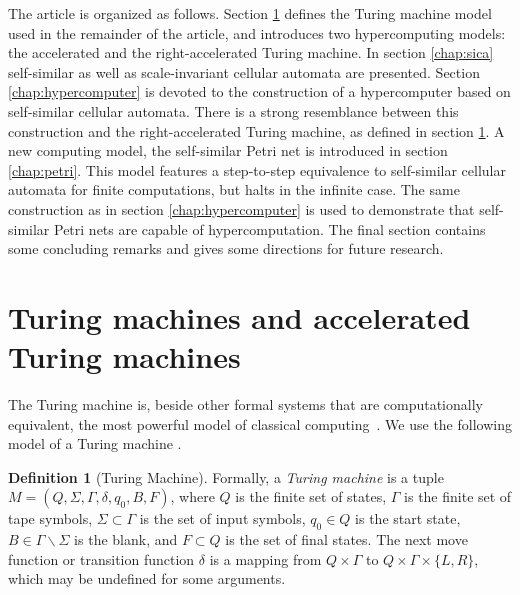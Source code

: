 \documentclass[pre,showpacs,showkeys,preprint]{revtex4}
\theoremstyle{definition}
\newtheorem{defn}{Definition}
\begin{document}

The article is organized as follows.
Section \ref{sec-tm} defines the  Turing machine model used in the remainder of the article,
and introduces two hypercomputing models: the accelerated and the right-accelerated Turing machine.
In section \ref{chap:sica} self-similar as well as scale-invariant cellular automata are presented.
Section \ref{chap:hypercomputer} is devoted to the construction of a hypercomputer based on
self-similar cellular automata.
There is a strong resemblance between this construction and the right-accelerated Turing machine,
as defined in section \ref{sec-tm}.
A new computing model, the self-similar Petri net  is introduced in section \ref{chap:petri}.
This model features a step-to-step equivalence to self-similar cellular automata for finite computations, but halts
in the infinite case.
The same construction as in section \ref{chap:hypercomputer} is used to demonstrate that self-similar Petri nets
are capable of hypercomputation.
The final section contains some concluding remarks and gives some directions for future research.

\section{Turing machines and accelerated Turing machines}
\label{sec-tm}

The Turing machine is, beside other formal systems that are computationally equivalent, the most powerful model
of classical computing~\cite{rogers1,odi:89,odi:99}.
We use the following model of a Turing machine \cite{hopcroft}.

\begin{defn}[Turing Machine]
Formally, a {\em Turing machine}  is a tuple
$M = (Q, \Sigma, \Gamma, \delta, q_0, B, F)$,
where $Q$ is the finite set of states, $\Gamma$ is the finite set of tape symbols,
$\Sigma \subset \Gamma$ is the set of input symbols, $q_0 \in Q$ is the start state,
$B \in \Gamma \backslash \Sigma$ is the blank, and $F \subset Q$ is the set of final states.
The next move function or transition function $\delta$ is a mapping from
$Q \times \Gamma$ to $Q \times \Gamma \times \{L, R\}$, which may be undefined for some arguments.
\end{defn}
\end{document}
